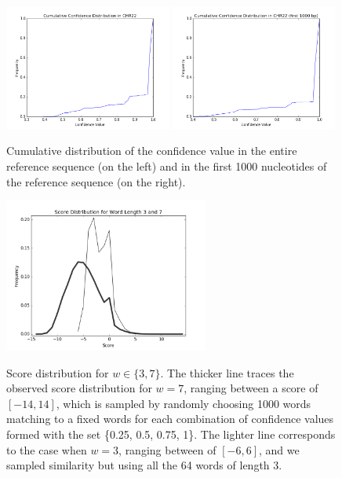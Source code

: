 \documentclass{article}
\begin{document}
\begin{figure}[tbp]
\begin{center}
\caption{Cumulative distribution of the confidence value in the entire reference sequence (on the left) and in the first 1000 nucleotides of the reference sequence (on the right).}
   \includegraphics[width=0.49\textwidth]{conf-cum}
   \includegraphics[width=0.49\textwidth]{conf-cum-1000}
\label{figure:conf_cum}
\end{center}
\end{figure}
\begin{figure}[tbp]
\begin{center}

\caption{Score distribution for $w \in \{3, 7\}$. The thicker line traces the observed score distribution for $w=7$, ranging between a score of $[-14, 14]$, which is sampled by randomly choosing 1000 words matching to a fixed words for each combination of confidence values formed with the set \{0.25, 0.5, 0.75, 1\}. The lighter line corresponds to the case when $w=3$, ranging between of $[-6, 6]$, and we sampled similarity but using all the 64 words of length 3.}
   \includegraphics[width=0.60\textwidth]{score-dist}
\label{figure:score_dist}
\end{center}
\end{figure}
\end{document}
